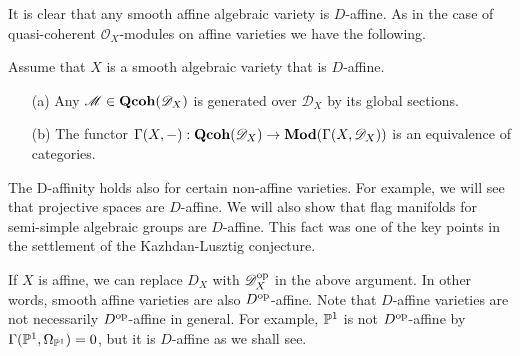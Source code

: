 It is clear that any smooth affine algebraic variety is $D$-affine. As in the case of quasi-coherent $\mathscr{O}_X$-modules on affine varieties we have the following.
\begin{proposition}\label{D-module global section equivalence for D-affine}
Assume that $X$ is a smooth algebraic variety that is $D$-affine.
\begin{enumerate}
    \item[(a)] Any $\mathscr{M}\in\Qcoh(\mathscr{D}_X)$ is generated over $\mathscr{D}_X$ by its global sections.
    \item[(b)] The functor $\Gamma(X,-):\Qcoh(\mathscr{D}_X)\to\Mod(\Gamma(X,\mathscr{D}_X))$ is an equivalence of categories.
\end{enumerate}
\end{proposition}

\begin{remark}
The D-affinity holds also for certain non-affine varieties. For example, we will see that projective spaces are $D$-affine. We will also show that flag manifolds for semi-simple algebraic groups are $D$-affine. This fact was one of the key points in the settlement of the Kazhdan-Lusztig conjecture.
\end{remark}

\begin{remark}
If $X$ is affine, we can replace $D_X$ with $\mathscr{D}_X^{\op}$ in the above argument. In other words, smooth affine varieties are also $D^{\op}$-affine. Note that $D$-affine varieties are not necessarily $D^{\op}$-affine in general. For example, $\P^1$ is not $D^{\op}$-affine by $\Gamma(\P^1,\Omega_{\P^1})=0$, but it is $D$-affine as we shall see.
\end{remark}

